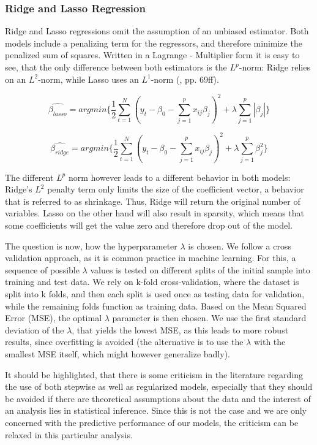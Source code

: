 \subsubsection{Ridge and Lasso Regression}
Ridge and Lasso regressions omit the assumption of an unbiased estimator. Both models include a penalizing term for the regressors, and therefore minimize the penalized sum of squares.  Written in a Lagrange - Multiplier form it is easy to see, that the only difference between both estimators is the $L^{p}$-norm: Ridge relies on an $L^{2}$-norm, while Lasso uses an  $L^{1}$-norm (\cite{friedman_elements_2001}, pp. 69ff).  

\begin{equation}
\hat{\beta_{lasso}}=argmin\{\frac{1}{2}\sum_{t=1}^{N}(y_{t}-\beta_{0}-\sum_{j=1}^{p}x_{ij}\beta_{j})^{2}+\lambda\sum_{j=1}^{p}|\beta_{j}|\}
\end{equation}

\begin{equation}
\hat{\beta_{ridge}}=argmin\{\frac{1}{2}\sum_{t=1}^{N}(y_{t}-\beta_{0}-\sum_{j=1}^{p}x_{ij}\beta_{j})^{2}+\lambda\sum_{j=1}^{p}\beta_{j}^{2}\}
\end{equation}

The different $L^{p}$ norm however leads to a different behavior in both models: Ridge's $L^2$ penalty term only limits the size of the coefficient vector, a behavior that is referred to as shrinkage. Thus, Ridge will return the original number of variables.  Lasso on the other hand will also result in sparsity, which means that some coefficients will get the value zero and therefore drop out of the model. 

The question is now, how the hyperparameter $\lambda$ is chosen. We follow a cross validation approach, as it is common practice in machine learning. For this, a sequence of possible $\lambda$ values is tested on different splits  of the initial sample into training and test data.  We rely on  k-fold cross-validation, where the dataset is split into k folds, and then each split is used once as testing data for validation, while the remaining folds function as training data. 
Based on the Mean Squared Error (MSE), the optimal $\lambda$ parameter is then chosen. We use the first standard deviation of the $\lambda$, that yields the lowest MSE, as this leads to more robust results, since overfitting is avoided (the alternative is to use the  $\lambda$ with the smallest MSE itself, which might however generalize badly). 

It should be highlighted, that there is some criticism in the literature regarding the use of both stepwise as well as regularized models, especially that they should be avoided if there are theoretical assumptions about the data and the interest of an analysis lies in statistical inference. Since this is not the case and we are only concerned with the predictive performance of our models, the criticism can be relaxed in this particular analysis. 




